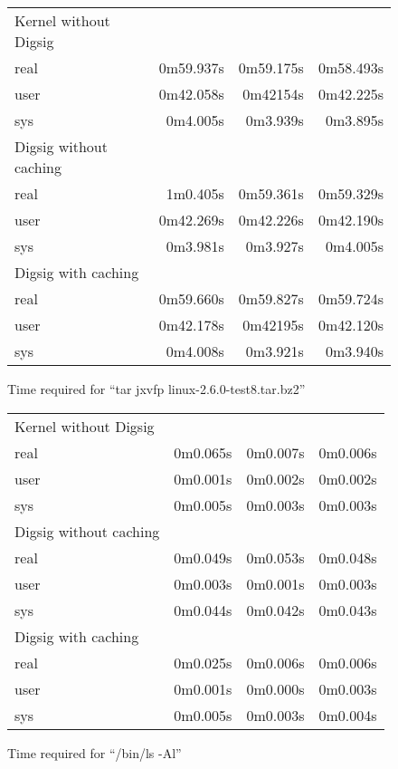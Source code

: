 \documentclass{article}
\begin{document}
\begin{figure}
\begin{tabular}{|l|r|r|r|}
\hline
	Kernel without Digsig & & & \\
	real  &  0m59.937s &0m59.175s &0m58.493s \\
	user  &  0m42.058s &0m42154s &0m42.225s \\
	sys   &  0m4.005s  &0m3.939s  &0m3.895s \\
\hline
	Digsig without caching & & & \\
	real  &  1m0.405s  & 0m59.361s & 0m59.329s \\
	user  &  0m42.269s & 0m42.226s & 0m42.190s \\
	sys   &  0m3.981s  & 0m3.927s  & 0m4.005s \\
\hline
	Digsig with caching & & & \\
	real  &  0m59.660s & 0m59.827s & 0m59.724s \\
	user  &  0m42.178s & 0m42195s & 0m42.120s \\
	sys   &  0m4.008s  & 0m3.921s  & 0m3.940s \\
\hline
\end{tabular}
\caption{Time required for ``tar jxvfp linux-2.6.0-test8.tar.bz2''}\label{fig:tartimings}
\end{figure}

\begin{figure}
\begin{tabular}{|l|r|r|r|}
\hline
	Kernel without Digsig & & & \\
	real  &  0m0.065s &0m0.007s &0m0.006s \\
	user  &  0m0.001s &0m0.002s &0m0.002s \\
	sys   &  0m0.005s &0m0.003s &0m0.003s \\
\hline
	Digsig without caching & & & \\
	real  &  0m0.049s &0m0.053s &0m0.048s \\
	user  &  0m0.003s &0m0.001s &0m0.003s \\
	sys   &  0m0.044s &0m0.042s &0m0.043s \\
\hline
	Digsig with caching & & & \\
	real  &  0m0.025s& 0m0.006s &0m0.006s \\
	user  &  0m0.001s& 0m0.000s &0m0.003s \\
	sys   &  0m0.005s& 0m0.003s &0m0.004s \\
\hline
\end{tabular}
\caption{Time required for ``/bin/ls -Al''}\label{fig:lstimings}
\end{figure}
\end{document}
